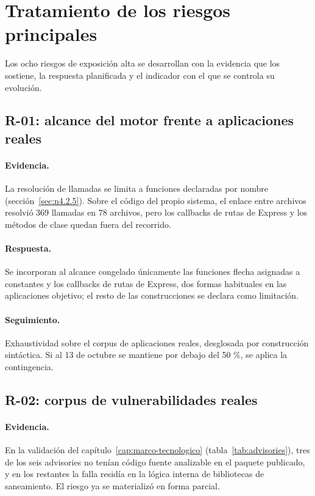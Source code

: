 \section{Tratamiento de los riesgos principales}\label{sec:n6.4}

Los ocho riesgos de exposición alta se desarrollan con la evidencia que los sostiene, la respuesta planificada y el indicador con el que se controla su evolución.

\subsection{R-01: alcance del motor frente a aplicaciones reales}\label{sec:n6.4.1}

\paragraph{Evidencia.} La resolución de llamadas se limita a funciones declaradas por nombre (sección~\ref{sec:n4.2.5}). Sobre el código del propio sistema, el enlace entre archivos resolvió 369 llamadas en 78 archivos, pero los callbacks de rutas de Express y los métodos de clase quedan fuera del recorrido.

\paragraph{Respuesta.} Se incorporan al alcance congelado únicamente las funciones flecha asignadas a constantes y los callbacks de rutas de Express, dos formas habituales en las aplicaciones objetivo; el resto de las construcciones se declara como limitación.

\paragraph{Seguimiento.} Exhaustividad sobre el corpus de aplicaciones reales, desglosada por construcción sintáctica. Si al 13 de octubre se mantiene por debajo del 50 \%, se aplica la contingencia.

\subsection{R-02: corpus de vulnerabilidades reales}\label{sec:n6.4.2}

\paragraph{Evidencia.} En la validación del capítulo~\ref{cap:marco-tecnologico} (tabla~\ref{tab:advisories}), tres de los seis advisories no tenían código fuente analizable en el paquete publicado, y en los restantes la falla residía en la lógica interna de bibliotecas de saneamiento. El riesgo ya se materializó en forma parcial.

